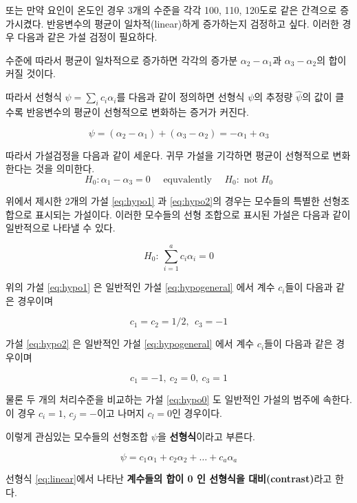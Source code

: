 \documentclass[
]{book}
\begin{document}
또는 만약 요인이 온도인 경우 3개의 수준을 각각 100, 110, 120도로 같은 간격으로 증가시켰다.
반응변수의 평균이 일차적(linear)하게 증가하는지 검정하고 싶다. 이러한 경우 다음과 같은
가설 검정이 필요하다.

수준에 따라서 평균이 일차적으로 증가하면 각각의 증가분 \(\alpha_2-\alpha_1\)과 \(\alpha_3 - \alpha_2\)의
합이 커질 것이다.

따라서 선형식 \(\psi=\sum_i c_i \alpha_i\)를 다음과 같이 정의하면 선형식 \(\psi\)의 추정량 \(\hat \psi\)의 값이 클수록 반응변수의 평균이 선형적으로 변화하는 증거가 커진다.

\[ \psi = (\alpha_2-\alpha_1) + (\alpha_3 - \alpha_2) = -\alpha_1 + \alpha_3 \]

따라서 가설검정을 다음과 같이 세운다. 귀무 가설을 기각하면 평균이 선형적으로 변화한다는 것을 의미한다.\\
\begin{equation}
H_0 : \alpha_1 - \alpha_3 = 0  \quad \text{ equvalently } \quad H_0: \text{ not } H_0
\label{eq:hypo2}
\end{equation}

위에서 제시한 2개의 가설 \eqref{eq:hypo1} 과 \eqref{eq:hypo2}의 경우는 모수들의 특별한 선형조합으로 표시되는 가설이다. 이러한 모수들의 선형 조합으로 표시된 가설은 다음과 같이 일반적으로 나타낼 수 있다.

\begin{equation}
H_0: ~ \sum_{i=1}^a c_i \alpha_i = 0
\label{eq:hypogeneral}
\end{equation}

위의 가설 \eqref{eq:hypo1} 은 일반적인 가설 \eqref{eq:hypogeneral} 에서 계수 \(c_i\)들이 다음과 같은 경우이며

\[ c_1 = c_2 = 1/2, ~~c_3 =-1 \]

가설 \eqref{eq:hypo2} 은 일반적인 가설 \eqref{eq:hypogeneral} 에서 계수 \(c_i\)들이 다음과 같은 경우이며

\[ c_1 = -1, ~ c_2= 0,~ c_3 =1 \]

물론 두 개의 처리수준을 비교하는 가설 \eqref{eq:hypo0} 도 일반적인 가설의 범주에 속한다. 이 경우 \(c_i=1\), \(c_j=-\)이고 나머지 \(c_l=0\)인 경우이다.

이렇게 관심있는 모수들의 선형조합 \(\psi\)을 \textbf{선형식}이라고 부른다.

\begin{equation}
\psi = c_1 \alpha_1 + c_2 \alpha_2 + \dots + c_a \alpha_a
\label{eq:linear}
\end{equation}

선형식 \eqref{eq:linear}에서 나타난 \textbf{계수들의 합이 0 인 선형식을 대비(contrast)}라고 한다.
\end{document}

